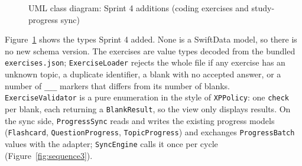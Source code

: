\documentclass[12pt,letterpaper]{article}
\newcommand{\st}[1]{\guillemotleft#1\guillemotright}   %
\newcommand{\ctitle}[1]{{\centering #1\par}}   %
\begin{document}
\begin{figure}[!htbp]
{}
\caption{UML class diagram: Sprint 4 additions (coding exercises and study-progress sync)}
\label{fig:domain4}
\end{figure}

Figure~\ref{fig:domain4} shows the types Sprint 4 added. None is a SwiftData model, so
there is no new schema version. The exercises are value types decoded from the
bundled \texttt{exercises.json}; \texttt{ExerciseLoader} rejects the whole file if any
exercise has an unknown topic, a duplicate identifier, a blank with no accepted answer,
or a number of \texttt{\_\_\_} markers that differs from its number of blanks.
\texttt{ExerciseValidator} is a pure enumeration in the style of \texttt{XPPolicy}:
one \texttt{check} per blank, each returning a \texttt{BlankResult}, so the view only
displays results. On the sync side, \texttt{ProgressSync} reads and writes the
existing progress models (\texttt{Flashcard}, \texttt{QuestionProgress},
\texttt{TopicProgress}) and exchanges \texttt{ProgressBatch} values with the adapter;
\texttt{SyncEngine} calls it once per cycle (Figure~\ref{fig:sequence3}).
\end{document}
